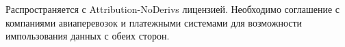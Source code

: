 Распространяется с Attribution-NoDerivs лицензией.
Необходимо соглашение с компаниями авиаперевозок и платежными системами
для возможности импользования данных с обеих сторон.